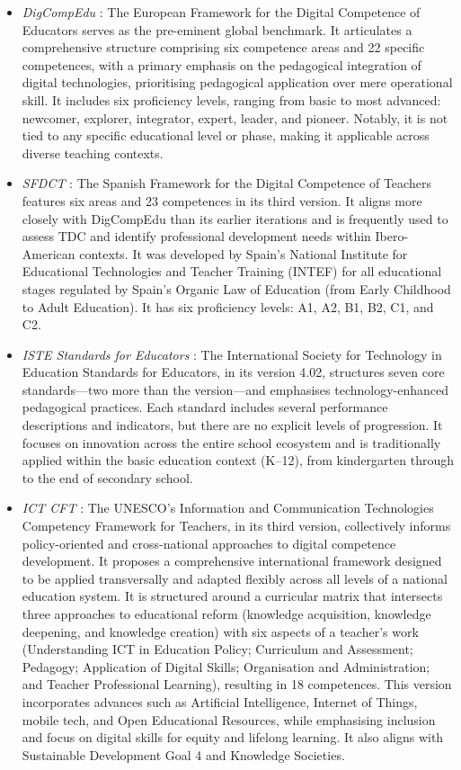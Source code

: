 \documentclass[english]{textolivre}
\begin{document}
\begin{itemize}
    \item \textit{DigCompEdu} \cite{redecker2017digcompedu}: The European Framework for the Digital Competence of Educators serves as the pre-eminent global benchmark. It articulates a comprehensive structure comprising six competence areas and 22 specific competences, with a primary emphasis on the pedagogical integration of digital technologies, prioritising pedagogical application over mere operational skill. It includes six proficiency levels, ranging from basic to most advanced: newcomer, explorer, integrator, expert, leader, and pioneer. Notably, it is not tied to any specific educational level or phase, making it applicable across diverse teaching contexts.
    \item \textit{SFDCT} \cite{INTEF2022}: The Spanish Framework for the Digital Competence of Teachers features six areas and 23 competences in its third version. It aligns more closely with DigCompEdu than its earlier iterations and is frequently used to assess TDC and identify professional development needs within Ibero-American contexts. It was developed by Spain’s National Institute for Educational Technologies and Teacher Training (INTEF) for all educational stages regulated by Spain’s Organic Law of Education (from Early Childhood to Adult Education). It has six proficiency levels: A1, A2, B1, B2, C1, and C2.
    \item \textit{ISTE Standards for Educators} \cite{ISTE2024}: The International Society for Technology in Education Standards for Educators, in its version 4.02, structures seven core standards—two more than the \textcite{ISTE2008} version—and emphasises technology-enhanced pedagogical practices. Each standard includes several performance descriptions and indicators, but there are no explicit levels of progression. It focuses on innovation across the entire school ecosystem and is traditionally applied within the basic education context (K–12), from kindergarten through to the end of secondary school.
    \item \textit{ICT CFT} \cite{unesco2018ict}: The UNESCO’s Information and Communication Technologies Competency Framework for Teachers, in its third version, collectively informs policy-oriented and cross-national approaches to digital competence development. It proposes a comprehensive international framework designed to be applied transversally and adapted flexibly across all levels of a national education system. It is structured around a curricular matrix that intersects three approaches to educational reform (knowledge acquisition, knowledge deepening, and knowledge creation) with six aspects of a teacher’s work (Understanding ICT in Education Policy; Curriculum and Assessment; Pedagogy; Application of Digital Skills; Organisation and Administration; and Teacher Professional Learning), resulting in 18 competences. This version incorporates advances such as Artificial Intelligence, Internet of Things, mobile tech, and Open Educational Resources, while emphasising inclusion and focus on digital skills for equity and lifelong learning. It also aligns with Sustainable Development Goal 4 and Knowledge Societies.

\end{itemize}
\end{document}
